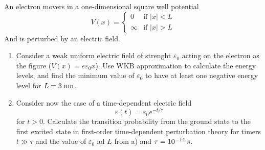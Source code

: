 \newpage
\setcounter{equation}{0}

\begin{esercizio}
   An electron movers in a one-dimensional square well potential
   \begin{equation*}
      V(x)=
      \begin{cases}
         0 & \text{if } |x|<L\\
         \infty & \text{if } |x|>L
      \end{cases}
   \end{equation*}
   And is perturbed by an electric field.
   \begin{enumerate}[label=\alph*), leftmargin=0.6cm]
      \item Consider a weak uniform electric field of strenght $\varepsilon_0$ acting on the electron as the figure ($V(x)= e \varepsilon_0 x$). Use WKB approximation to calculate the energy levels, and find the minimum value of $\varepsilon_0$ to have at least one negative energy level for $L=3 \; \rm nm$.
      \item Consider now the case of a time-dependent electric field
      \begin{equation*}
         \varepsilon(t)
         =\varepsilon_0 e^{-t/\tau}
      \end{equation*}
      for $t>0$. Calculate the transition probability from the ground state to the first excited state in first-order time-dependent perturbation theory for timers $t \gg \tau$ and the value of $\varepsilon_0$ ad $L$ from a) and $\tau=10^{-14} \; \rm s$.
   \end{enumerate}
\end{esercizio}
